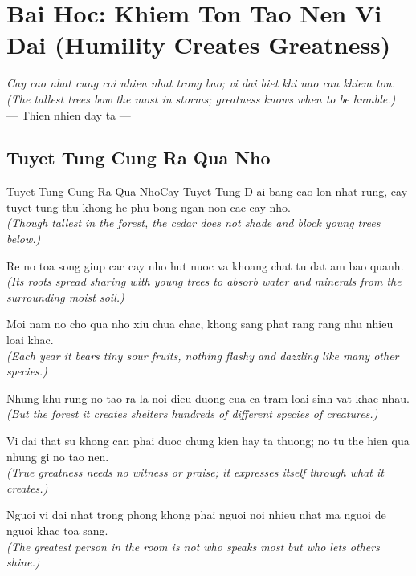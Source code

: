 \chapter{Bai Hoc: Khiem Ton Tao Nen Vi Dai (Humility Creates Greatness)}
\begin{center}
  \textit{\color{truyenblue}Cay cao nhat cung coi nhieu nhat trong bao; vi dai biet khi nao can khiem ton.}\\
  \textit{(The tallest trees bow the most in storms; greatness knows when to be humble.)}\\[4pt]
  \small\color{truyengold}--- Thien nhien day ta ---
\end{center}
\ngancach

\section{Tuyet Tung Cung Ra Qua Nho}
\begin{truyen}{Tuyet Tung Cung Ra Qua Nho}{Cay Tuyet Tung}
D ai bang cao lon nhat rung, cay tuyet tung thu khong he phu bong ngan non cac cay nho.\\
\textit{(Though tallest in the forest, the cedar does not shade and block young trees below.)}

Re no toa song giup cac cay nho hut nuoc va khoang chat tu dat am bao quanh.\\
\textit{(Its roots spread sharing with young trees to absorb water and minerals from the surrounding moist soil.)}

Moi nam no cho qua nho xiu chua chac, khong sang phat rang rang nhu nhieu loai khac.\\
\textit{(Each year it bears tiny sour fruits, nothing flashy and dazzling like many other species.)}

Nhung khu rung no tao ra la noi dieu duong cua ca tram loai sinh vat khac nhau.\\
\textit{(But the forest it creates shelters hundreds of different species of creatures.)}

Vi dai that su khong can phai duoc chung kien hay ta thuong; no tu the hien qua nhung gi no tao nen.\\
\textit{(True greatness needs no witness or praise; it expresses itself through what it creates.)}

\end{truyen}
\begin{baihoc}
  Nguoi vi dai nhat trong phong khong phai nguoi noi nhieu nhat ma nguoi de nguoi khac toa sang.\\
  \textit{(The greatest person in the room is not who speaks most but who lets others shine.)}
\end{baihoc}

